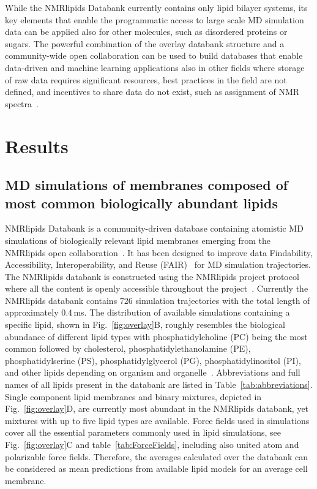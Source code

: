 \documentclass[fleqn,10pt]{wlscirep}
\begin{document}
While the NMRlipids Databank currently contains only lipid bilayer systems, its key elements that enable the programmatic access to large scale MD simulation data can be applied also for other molecules, such as disordered proteins or sugars. The powerful combination of the overlay databank structure and a community-wide open collaboration can be used to build databases that enable data-driven and machine learning applications also in other fields where storage of raw data requires significant resources, best practices in the field are not defined, and incentives to share data do not exist, such as assignment of NMR spectra~\cite{klukowski22}. 



\section{Results}

\subsection{MD simulations of membranes composed of most common biologically abundant lipids}

NMRlipids Databank is a community-driven database containing atomistic MD simulations of biologically relevant lipid membranes emerging from the NMRlipids open collaboration~\cite{botan15,ollila16,catte16,antila19,bacle21}. It has been designed to improve data Findability, Accessibility, Interoperability, and Reuse (FAIR)~\cite{wilkinson16} for MD simulation trajectories. The NMRlipids databank is constructed using the NMRlipids project protocol where all the content is openly accessible throughout the project~\cite{botan15}. Currently the NMRlipids databank contains 726 simulation trajectories with the total length of approximately 0.4\,ms. The distribution of available simulations containing a specific lipid, shown in Fig.~\ref{fig:overlay}B, roughly resembles the biological abundance of different lipid types with phosphatidylcholine (PC) being the most common followed by cholesterol, phosphatidylethanolamine (PE), phosphatidylserine (PS), phosphatidylglycerol (PG), phosphatidylinositol (PI), and other lipids depending on organism and organelle~\cite{vanmeer08}. Abbreviations and full names of all lipids present in the databank are listed in Table~\ref{tab:abbreviations}. Single component lipid membranes and binary mixtures, depicted in Fig.~\ref{fig:overlay}D, are currently most abundant in the NMRlipids databank, yet mixtures with up to five lipid types are available. Force fields used in simulations cover all the essential parameters commonly used in lipid simulations, see Fig.~\ref{fig:overlay}C and table~\ref{tab:ForceFields}, including also united atom and polarizable force fields. Therefore, the averages calculated over the databank can be considered as mean predictions from available lipid models for an average cell membrane.
\end{document}
